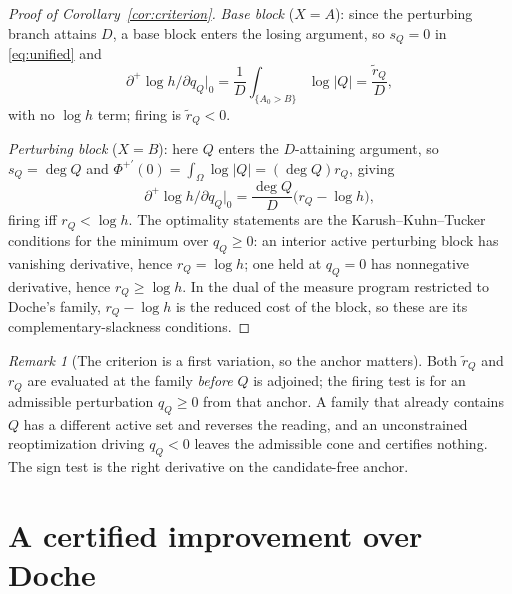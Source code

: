\documentclass[11pt,reqno]{amsart}
\theoremstyle{plain}
\theoremstyle{definition}
\theoremstyle{remark}
\newtheorem{remark}[theorem]{Remark}
\newcommand{\rQ}{r_Q}
\newcommand{\dplus}{\partial^{+}}
\begin{document}
\begin{proof}[Proof of Corollary~\ref{cor:criterion}]
\emph{Base block} ($X=A$): since the perturbing branch attains $D$, a base block
enters the losing argument, so $s_Q=0$ in \eqref{eq:unified} and
\begin{equation}\label{eq:base-marg}
  \dplus\!\log h/\partial q_Q\big|_0=\frac1D\int_{\{A_0>B\}}\log|Q|
  =\frac{\widetilde r_Q}{D},
\end{equation}
with no $\log h$ term; firing is $\widetilde r_Q<0$.

\emph{Perturbing block} ($X=B$): here $Q$ enters the $D$-attaining argument, so
$s_Q=\deg Q$ and $\Phi^{+\prime}(0)=\int_\Omega\log|Q|=(\deg Q)\rQ$, giving
\begin{equation}\label{eq:marginal}
  \dplus\!\log h/\partial q_Q\big|_0=\frac{\deg Q}{D}\bigl(\rQ-\log h\bigr),
\end{equation}
firing iff $\rQ<\log h$. The optimality statements are the Karush--Kuhn--Tucker
conditions for the minimum over $q_Q\ge0$: an interior active perturbing block has
vanishing derivative, hence $\rQ=\log h$; one held at $q_Q=0$ has nonnegative
derivative, hence $\rQ\ge\log h$. In the dual of the \citet[\S6]{BMQS} measure program
restricted to Doche's family, $\rQ-\log h$ is the reduced cost of the block, so these
are its complementary-slackness conditions.
\end{proof}

\begin{remark}[The criterion is a first variation, so the anchor matters]\label{rem:anchor}
Both $\widetilde r_Q$ and $\rQ$ are evaluated at the family \emph{before} $Q$ is
adjoined; the firing test is for an admissible perturbation $q_Q\ge0$ from that anchor.
A family that already contains $Q$ has a different active set and reverses the reading,
and an unconstrained reoptimization driving $q_Q<0$ leaves the admissible cone and
certifies nothing. The sign test is the right derivative on the candidate-free anchor.
\end{remark}

\section{A certified improvement over Doche}\label{sec:bound}
\end{document}
